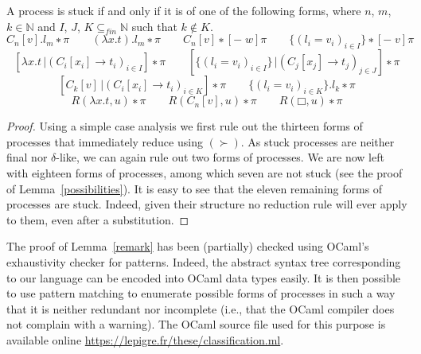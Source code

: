 \begin{lemma}\label{remark}
  A process is stuck if and only if it is of one of the following forms,
  where $n$, $m$, $k ∈ \mathbb{N}$ and $I$, $J$, $K ⊆_{fin} \mathbb{N}$ such
  that $k ∉ K$.
  $$
    C_n[v].l_m ∗ π
    \quad\quad
    (λx.t).l_m ∗ π
    \quad\quad
    C_n[v] ∗ [{-}\;w]π
    \quad\quad
    \{(l_i = v_i)_{i∈I}\} ∗ [{-}\;v]π
  $$
  $$
    [λx.t\,| (C_i[x_i] → t_i)_{i∈I}] ∗ π
    \quad\quad
    [\{(l_i = v_i)_{i∈I}\}\,| (C_j[x_j] → t_j)_{j∈J}] ∗ π
  $$
  $$
    [C_k[v]\,|(C_i[x_i] → t_i)_{i∈K}] ∗ π
    \quad\quad
    \{(l_i = v_i)_{i∈K}\}.l_k ∗ π
  $$
  $$
    R(λx.t,u) ∗ π
    \quad\quad
    R(C_n[v],u) ∗ π
    \quad\quad
    R(□,u) ∗ π
  $$
  \begin{proof}
    Using a simple case analysis we first rule out the thirteen forms of
    processes that immediately reduce using $(≻)$. As stuck processes are
    neither final nor $δ$-like, we can again rule out two forms of processes.
    We are now left with eighteen forms of processes, among which seven
    are not stuck (see the proof of Lemma~\ref{possibilities}). It is easy to
    see that the eleven remaining forms of processes are stuck. Indeed, given
    their structure no reduction rule will ever apply to them, even after a
    substitution.
  \end{proof}
\end{lemma}
The proof of Lemma~\ref{remark} has been (partially) checked using OCaml's
exhaustivity checker for patterns. Indeed, the abstract syntax tree
corresponding to our language can be encoded into OCaml data types easily.
It is then possible to use pattern matching to enumerate possible forms of
processes in such a way that it is neither redundant nor incomplete (i.e.,
that the OCaml compiler does not complain with a warning). The OCaml source
file used for this purpose is available online
\url{https://lepigre.fr/these/classification.ml}.

